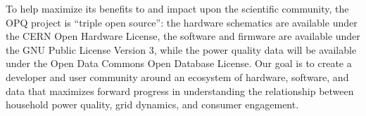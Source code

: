 To help maximize its benefits to and impact upon the scientific community, the OPQ project is ``triple open source'': the hardware schematics are available under the CERN Open Hardware License, the software and firmware are available under the GNU Public License Version 3, while the power quality data will be available under the Open Data Commons Open Database License.  Our goal is to create a developer and user community around an ecosystem of hardware, software, and data that maximizes forward progress in understanding the relationship between household power quality, grid dynamics, and consumer engagement.





 

